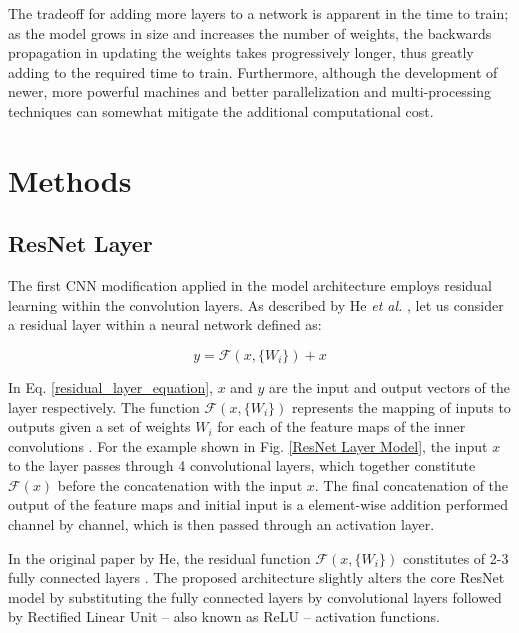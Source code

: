 \documentclass[conference]{IEEEtran}
\begin{document}
The tradeoff for adding more layers to a network is apparent in the time to train; as the model grows in size and increases the number of weights, the backwards propagation in updating the weights takes progressively longer, thus greatly adding to the required time to train. Furthermore, although the development of newer, more powerful machines and better parallelization and multi-processing techniques can somewhat mitigate the additional computational cost.
\section{Methods}
\subsection{ResNet Layer}
The first CNN modification applied in the model architecture employs residual learning within the convolution layers. As described by He \textit{et al.} \cite{He2016}, let us consider a residual layer within a neural network defined as:

\begin{equation}
y = \mathcal{F} \left(x,\{W_i\}\right) + x
\label{residual_layer_equation}
\end{equation}

In Eq. \ref{residual_layer_equation}, $x$ and $y$ are the input and output vectors of the layer respectively. The function $\mathcal{F} \left(x,\{W_i\}\right)$ represents the mapping of inputs to outputs given a set of weights $W_i$ for each of the feature maps of the inner convolutions \cite{He2016}. For the example shown in Fig. \ref{ResNet Layer Model}, the input $x$ to the layer passes through 4 convolutional layers, which together constitute $\mathcal{F}(x)$ before the concatenation with the input $x$. The final concatenation of the output of the feature maps and initial input is a element-wise addition performed channel by channel, which is then passed through an activation layer. 

In the original paper by He, the residual function $\mathcal{F} \left(x,\{W_i\}\right)$ constitutes of 2-3 fully connected layers \cite{He2016}. The proposed architecture slightly alters the core ResNet model by substituting the fully connected layers by convolutional layers followed by Rectified Linear Unit -- also known as ReLU -- activation functions.
\end{document}
